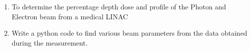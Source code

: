 \begin{enumerate}
    \item To determine the percentage depth dose and profile of the Photon and Electron beam from a medical LINAC
    \item Write a python code to find various beam parameters from the data obtained during the measurement.
\end{enumerate}
